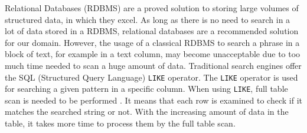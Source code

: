 









Relational Databases (RDBMS) are %
a proved solution to storing large volumes of structured data, in which they excel.
As long as there is no need to search in a lot of data stored in a RDBMS, relational databases are a recommended solution for our domain.
However, the usage of a classical RDBMS to search a phrase in a block of text, for example in a text column, may become unacceptable due to too much time needed to scan a huge amount of data.
Traditional search engines offer the SQL (Structured Query Language) \texttt{LIKE} operator. 
The \texttt{LIKE} operator is used for searching a given pattern in a specific column.
When using \texttt{LIKE}, full table scan is needed to be performed \cite{ali2011sphinx}. 
It means that each row is examined to check if it matches the searched string or not. 
With the increasing amount of data in the table, it takes more time to process them by the full table scan.

